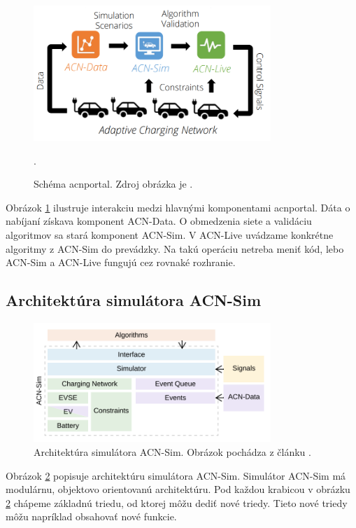 \begin{figure}[H]
    \includegraphics[width=0.8\textwidth]{images/acn_research_portal_pic.png}
    \centering
    \caption[Schéma acnportal.]{Schéma acnportal. Zdroj obrázka je \cite{lee2021acnsim}.}.
    \label{acn:obr}
    \end{figure}
Obrázok \ref{acn:obr} ilustruje interakciu medzi hlavnými komponentami acnportal. Dáta o nabíjaní získava komponent ACN-Data. O obmedzenia siete a validáciu algoritmov sa stará komponent ACN-Sim. V ACN-Live uvádzame konkrétne algoritmy z ACN-Sim do prevádzky. Na takú operáciu netreba meniť kód, lebo ACN-Sim a ACN-Live fungujú cez rovnaké rozhranie. \cite{lee2021acnsim,lee2021adaptivephd}





\subsection{Architektúra simulátora ACN-Sim}

\begin{figure}[H]
    \includegraphics[width=0.8\textwidth]{images/acn_architecture.png}
    \centering
    \caption[Architektúra simulátora ACN-Sim.]{Architektúra simulátora ACN-Sim. Obrázok pochádza z článku \cite{lee2021acnsim}.}
    \label{architectureacnsim+:obr2}
    \end{figure}
Obrázok \ref{architectureacnsim+:obr2} popisuje architektúru simulátora ACN-Sim. Simulátor ACN-Sim má modulárnu, objektovo orientovanú architektúru. Pod každou krabicou v obrázku \ref{architectureacnsim+:obr2} chápeme základnú triedu, od ktorej môžu dediť nové triedy. Tieto nové triedy môžu napríklad obsahovať nové funkcie.  


